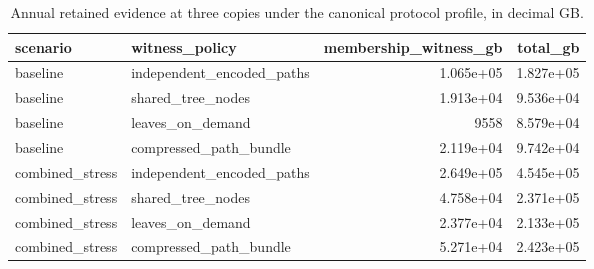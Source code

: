 \begin{table}[t]
\centering
\small
\caption{Annual retained evidence at three copies under the canonical protocol profile, in decimal GB.}
\label{tab:compact-storage}
\begin{tabular}{llrr}
\toprule
scenario & witness\_policy & membership\_witness\_gb & total\_gb \\
\midrule
baseline & independent\_encoded\_paths & 1.065e+05 & 1.827e+05 \\
baseline & shared\_tree\_nodes & 1.913e+04 & 9.536e+04 \\
baseline & leaves\_on\_demand & 9558 & 8.579e+04 \\
baseline & compressed\_path\_bundle & 2.119e+04 & 9.742e+04 \\
combined\_stress & independent\_encoded\_paths & 2.649e+05 & 4.545e+05 \\
combined\_stress & shared\_tree\_nodes & 4.758e+04 & 2.371e+05 \\
combined\_stress & leaves\_on\_demand & 2.377e+04 & 2.133e+05 \\
combined\_stress & compressed\_path\_bundle & 5.271e+04 & 2.423e+05 \\
\bottomrule
\end{tabular}
\end{table}
